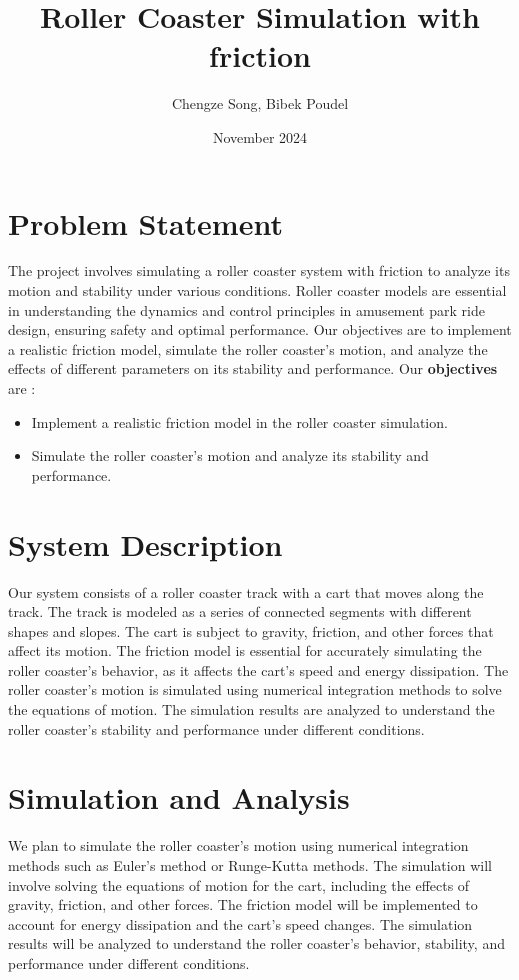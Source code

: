 \documentclass[12pt]{article}
\title{Roller Coaster Simulation with friction}
\author{Chengze Song, Bibek Poudel}
\date{November 2024}
\begin{document}
\maketitle

\section*{Problem Statement}
The project involves simulating a roller coaster system with friction to analyze its motion and stability under various conditions. Roller coaster models are essential in understanding the dynamics and control principles in amusement park ride design, ensuring safety and optimal performance. Our objectives are to implement a realistic friction model, simulate the roller coaster's motion, and analyze the effects of different parameters on its stability and performance. Our \textbf{objectives} are :
\begin{itemize}
    \item Implement a realistic friction model in the roller coaster simulation.
    \item Simulate the roller coaster's motion and analyze its stability and performance.
\end{itemize}

\section*{System Description}
Our system consists of a roller coaster track with a cart that moves along the track. The track is modeled as a series of connected segments with different shapes and slopes. The cart is subject to gravity, friction, and other forces that affect its motion. The friction model is essential for accurately simulating the roller coaster's behavior, as it affects the cart's speed and energy dissipation. The roller coaster's motion is simulated using numerical integration methods to solve the equations of motion. The simulation results are analyzed to understand the roller coaster's stability and performance under different conditions.

\section*{Simulation and Analysis}
We plan to simulate the roller coaster's motion using numerical integration methods such as Euler's method or Runge-Kutta methods. The simulation will involve solving the equations of motion for the cart, including the effects of gravity, friction, and other forces. The friction model will be implemented to account for energy dissipation and the cart's speed changes. The simulation results will be analyzed to understand the roller coaster's behavior, stability, and performance under different conditions.
\end{document}

